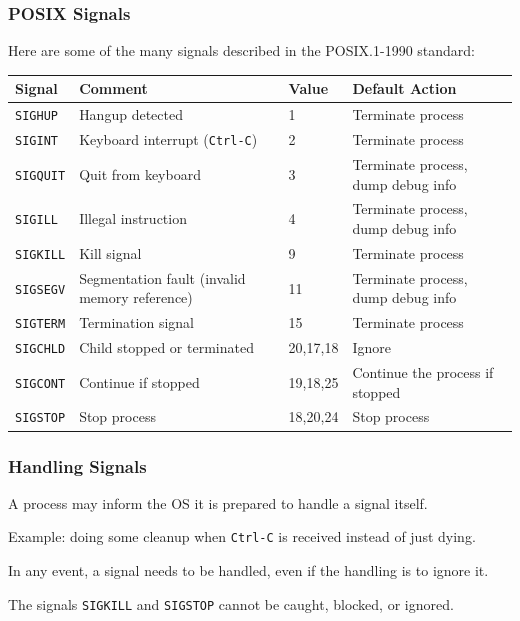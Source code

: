 \begin{frame}
	\frametitle{POSIX Signals}

	Here are some of the many signals described in the POSIX.1-1990 standard:

	{\scriptsize
	\begin{center}
		\begin{tabular}{l|l|l|l}
			\textbf{Signal}  & \textbf{Comment}                              & \textbf{Value} & \textbf{Default Action}            \\ \hline
			\texttt{SIGHUP}  & Hangup detected                               & 1              & Terminate process                  \\
			\texttt{SIGINT}  & Keyboard interrupt (\texttt{Ctrl-C})          & 2              & Terminate process                  \\
			\texttt{SIGQUIT} & Quit from keyboard                            & 3              & Terminate process, dump debug info \\
			\texttt{SIGILL}  & Illegal instruction                           & 4              & Terminate process, dump debug info \\
			\texttt{SIGKILL} & Kill signal                                   & 9              & Terminate process                  \\
			\texttt{SIGSEGV} & Segmentation fault (invalid memory reference) & 11             & Terminate process, dump debug info \\
			\texttt{SIGTERM} & Termination signal                            & 15             & Terminate process                  \\
			\texttt{SIGCHLD} & Child stopped or terminated                   & 20,17,18       & Ignore                             \\
			\texttt{SIGCONT} & Continue if stopped                           & 19,18,25       & Continue the process if stopped    \\
			\texttt{SIGSTOP} & Stop process                                  & 18,20,24       & Stop process                       \\
		\end{tabular}
	\end{center}
	}

\end{frame}


\begin{frame}
	\frametitle{Handling Signals}

	A process may inform the OS it is prepared to handle a signal itself.

	Example: doing some cleanup when \texttt{Ctrl-C} is received instead of just dying.

	In any event, a signal needs to be handled, even if the handling is to ignore it.

	The signals \texttt{SIGKILL} and \texttt{SIGSTOP} cannot be caught, blocked, or ignored.


\end{frame}


